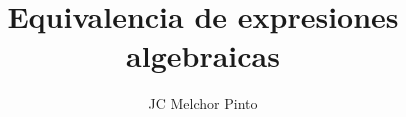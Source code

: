 \documentclass[12pt,addpoints]{guia}
\title{Equivalencia de expresiones algebraicas}
\author{JC Melchor Pinto}
\begin{document}
\INFO%
\ejemplosboxed[]
\begin{questions}
    \questionboxed[10]{}
    \questionboxed[5]{}
    \questionboxed[10]{}
    \questionboxed[5]{}
    \ejemplosboxed[]
    \questionboxed[10]{}
    \ejemplosboxed[]
    \questionboxed[18]{}
    \questionboxed[16]{}
    \ejemplosboxed[]
    \questionboxed[16]{}
    \questionboxed[10]{}
\end{questions}
\end{document}
